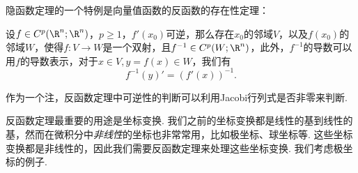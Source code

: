 隐函数定理的一个特例是向量值函数的反函数的存在性定理：

\begin{theorem}[反函数定理]\label{thm:inverse-function}
    设$f\in C^p(\R^n;\R^n)$，$p\geq 1$，$f'(x_0)$可逆，那么存在$x_0$的邻域$V$，以及$f(x_0)$的邻域$W$，使得$f:V\to W$是一个双射，且$f^{-1}\in C^p(W;\R^n)$，此外，$f^{-1}$的导数可以用$f$的导数表示，对于$x\in V,y=f(x)\in W$，我们有
    \[f^{-1}(y)'=(f'(x))^{-1}.\]
\end{theorem}

作为一个注，反函数定理中可逆性的判断可以利用Jacobi行列式是否非零来判断. 

反函数定理最重要的用途是坐标变换. 我们之前的坐标变换都是线性的基到线性的基，然而在微积分中\emph{非线性}的坐标也非常常用，比如极坐标、球坐标等. 这些坐标变换都是非线性的，因此我们需要反函数定理来处理这些坐标变换. 我们考虑极坐标的例子. 

